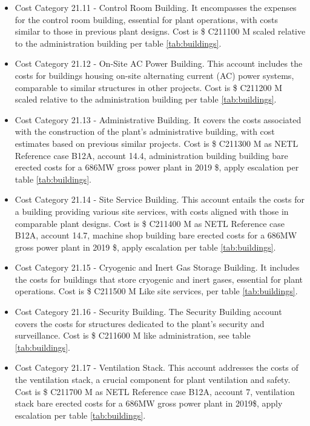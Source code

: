 \begin{itemize}
\item Cost Category 21.11 - Control Room Building. It encompasses the expenses for the control room building, essential for plant operations, with costs similar to those in previous plant designs.  Cost is \$ C211100 M scaled relative to the administration building per table \ref{tab:buildings}. 
\item Cost Category 21.12 - On-Site AC Power Building. This account includes the costs for buildings housing on-site alternating current (AC) power systems, comparable to similar structures in other projects.  Cost is \$ C211200 M scaled relative to the administration building per table \ref{tab:buildings}. 
\item Cost Category 21.13 - Administrative Building. It covers the costs associated with the construction of the plant’s administrative building, with cost estimates based on previous similar projects. Cost is \$ C211300 M as NETL Reference case B12A, account 14.4, administration building building bare erected costs for a 686MW gross power plant in 2019 \$, apply escalation per table \ref{tab:buildings}. 
\item Cost Category 21.14 - Site Service Building. This account entails the costs for a building providing various site services, with costs aligned with those in comparable plant designs. Cost is \$ C211400 M as NETL Reference case B12A, account 14.7, machine shop building bare erected costs for a 686MW gross power plant in 2019 \$, apply escalation per table \ref{tab:buildings}. 
\item Cost Category 21.15 - Cryogenic and Inert Gas Storage Building. It includes the costs for buildings that store cryogenic and inert gases, essential for plant operations.  Cost is \$ C211500 M Like site services, per table \ref{tab:buildings}. 
\item Cost Category 21.16 - Security Building. The Security Building account covers the costs for structures dedicated to the plant’s security and surveillance. Cost is \$ C211600 M like administration, see table \ref{tab:buildings}. 
\item Cost Category 21.17 - Ventilation Stack. This account addresses the costs of the ventilation stack, a crucial component for plant ventilation and safety. Cost is \$ C211700 M as NETL Reference case B12A, account 7, ventilation stack bare erected costs for a 686MW gross power plant in 2019\$, apply escalation per table \ref{tab:buildings}.
\end{itemize}









